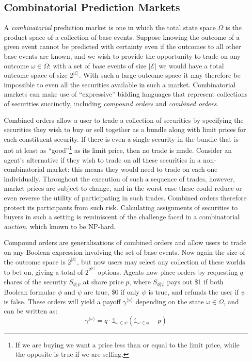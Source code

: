 \subsection{Combinatorial Prediction Markets}

A \emph{combinatorial} prediction market is one in which the total state space
$\Omega$ is the product space of a collection of base events. Suppose knowing
the outcome of a given event cannot be predicted with certainty even if the
outcomes to all other base events are known, and we wish to provide the
opportunity to trade on any outcome $\omega \in \Omega$: with a set of base
events of size $\mathcal{|E|}$ we would have a total outcome space of size
$2^\mathcal{|E|}$.  With such a large outcome space it may therefore be
impossible to even all the securities available in such a market. Combinatorial
markets can make use of ``expressive'' bidding languages that represent
collections of securities succinctly, including \emph{compound orders} and
\emph{combined orders}.

Combined orders allow a user to trade a collection of securities by specifying
the securities they wish to buy or sell together as a bundle along with limit
prices for each constituent security. If there is even a single security in the
bundle that is not at least as ``good''\footnote{If we are buying we want a
price less than or equal to the limit price, while the opposite is true if we
are selling.} as its limit price, then no trade is made. Consider an agent's
alternative if they wish to trade on all these securities in a
non-combinatorial market: this means they would need to trade on each one
individually. Throughout the execution of such a sequence of trades, however,
market prices are subject to change, and in the worst case these could reduce
or even reverse the utility of participating in such trades. Combined orders
therefore protect its participants from such risk. Calculating assignments of
securities to buyers in such a setting is reminiscent of the challenge faced
in a combinatorial \emph{auction}, which known to be NP-hard.

Compound orders are generalisations of combined orders and allow users to trade
on any Boolean expression involving the set of base events. Now again the size
of the outcome space is $2^\mathcal{|E|}$, but now users may select any
collection of these worlds to bet on, giving a total of $2^{2^\mathcal{|E|}}$
options. Agents now place orders by requesting $q$ shares of the security
$S_{\phi|\psi}$ at share price $p$, where $S_{\phi|\psi}$ pays out \$1 if both
Boolean formulae $\phi$ and $\psi$ are true, \$0 if only $\psi$ is true, and
refunds the user if $\psi$ is false. These orders will yield a payoff
$\gamma^{\langle \omega \rangle}$ depending on the state $\omega \in \Omega$,
and can be written as:
$$
\gamma^{\langle \omega \rangle} = q \cdot \mathds{1}_{\omega \in \psi}
(\mathds{1}_{\omega \in \phi} - p)
$$

